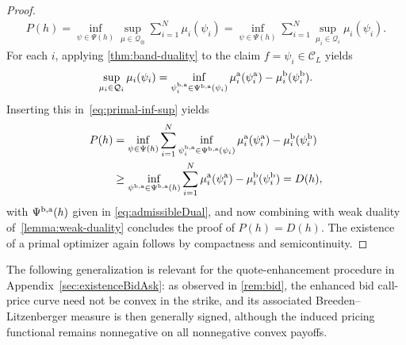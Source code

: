 \documentclass[11pt]{article}
\newcommand{\cC}{\mathcal{C}}
\newcommand{\cQ}{\mathcal{Q}}
\theoremstyle{plain}
\theoremstyle{definition}
\theoremstyle{remark}
\theoremstyle{plain}
\begin{document}
\begin{proof}
     \begin{equation}\label{eq:primal-inf-sup}
             \begin{aligned}
        P(h) =\inf_{\psi \in \Psi(h)}\sup_{\mu \in \cQ_{\otimes}} \sum_{i=1}^N \mu_i(\psi_i)= \inf_{\psi \in \Psi(h)}\sum_{i=1}^N \sup_{\mu_i \in \cQ_i}  \mu_i(\psi_i).
    \end{aligned}
     \end{equation}
    For each $i$, applying \cref{thm:band-duality} to the claim $f=\psi_i\in \cC_{L}$ yields 
    \begin{equation*}\label{eq:convex-band}
           \sup_{\mu_i\in \cQ_i} \mu_i(\psi_i) = \inf_{\psi_{i}^{\rm b,a}\in \Psi^{\rm b,a}(\psi_i)}\mu_i^{\rm a}(\psi_i^{\rm a}) -\mu_i^{\rm b}(\psi_i^{\rm b}).
    \end{equation*}
    Inserting this in~\eqref{eq:primal-inf-sup} yields
    \begin{align*}
        P(h)& = \inf_{\psi \in \Psi(h)}\sum_{i=1}^N \inf_{\psi_{i}^{\rm b,a}\in \Psi^{\rm b,a}(\psi_i)}\mu_i^{\rm a}(\psi_i^{\rm a}) -\mu_i^{\rm b}(\psi_i^{\rm b})\\ 
        &\geq \inf_{\psi^{\rm b,a}\in \Psi^{\rm b,a}(h)} \sum_{i=1}^N \mu_i^{\rm a}(\psi_i^{\rm a}) -\mu_i^{\rm b}(\psi_i^{\rm b}) = D(h),
    \end{align*}
    with $\Psi^{\rm b,a}(h)$ given in \eqref{eq:admissibleDual}, and now
    combining with weak duality of~\cref{lemma:weak-duality} concludes the proof of $P(h)=D(h)$. The existence of a primal optimizer again follows by compactness and semicontinuity.
%
%
%
%
%
%
%
%
%
%
%
%
\end{proof}
%
%
%
%
%
%
%

The following generalization is relevant for the quote-enhancement procedure in
Appendix~\ref{sec:existenceBidAsk}: as observed in \cref{rem:bid}, the
enhanced bid call-price curve need not be convex in the strike, and its
associated Breeden--Litzenberger measure is then generally signed, although
the induced pricing functional remains nonnegative on all nonnegative
convex payoffs.
\end{document}
